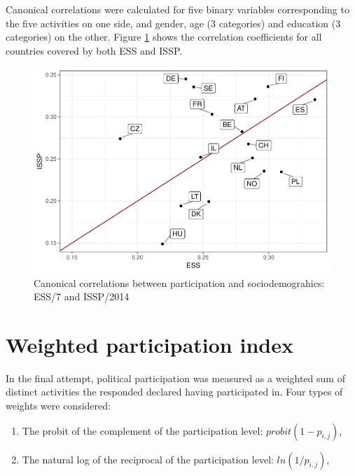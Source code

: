 \documentclass[12pt,]{article}
\providecommand{\tightlist}{%
  \setlength{\itemsep}{0pt}\setlength{\parskip}{0pt}}
\begin{document}
Canonical correlations were calculated for five binary variables corresponding to the five activities on one side, and gender, age (3 categories) and education (3 categories) on the other. Figure \ref{fig:can-cor} shows the correlation coefficients for all countries covered by both ESS and ISSP.

\begin{figure}[H]

{\centering \includegraphics{paper_files/figure-latex/can-cor-1} 

}

\caption{Canonical correlations between participation and sociodemograhics: ESS/7 and ISSP/2014}\label{fig:can-cor}
\end{figure}

\hypertarget{weighted-participation-index}{%
\section{Weighted participation index}\label{weighted-participation-index}}

In the final attempt, political participation was measured as a weighted sum of distinct activities the responded declared having participated in. Four types of weights were considered:

\begin{enumerate}
\def\labelenumi{\arabic{enumi}.}
\tightlist
\item
  The probit of the complement of the participation level: \(probit(1 - p_{i,j})\),\\
\item
  The natural log of the reciprocal of the participation level: \(ln(1 / p_{i,j})\),
\end{enumerate}
\end{document}
